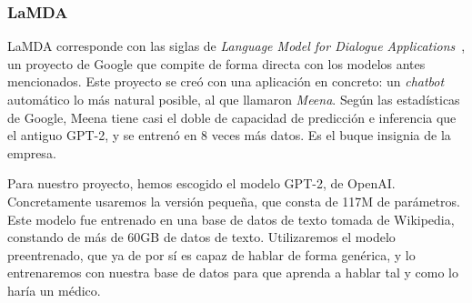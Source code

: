 \subsubsection{LaMDA}
LaMDA corresponde con las siglas de \textit{Language Model for Dialogue Applications}~\cite{LaMDAGoogle2020}, un proyecto de Google que compite de forma directa con los modelos antes mencionados. Este proyecto se creó con una aplicación en concreto: un \textit{chatbot} automático lo más natural posible, al que llamaron \textit{Meena}. Según las estadísticas de Google, Meena tiene casi el doble de capacidad de predicción e inferencia que el antiguo GPT-2, y se entrenó en 8 veces más datos. Es el buque insignia de la empresa.

\vspace{15mm}
Para nuestro proyecto, hemos escogido el modelo GPT-2, de OpenAI. Concretamente usaremos la versión pequeña, que consta de 117M de parámetros. Este modelo fue entrenado en una base de datos de texto tomada de Wikipedia, constando de más de 60GB de datos de texto. Utilizaremos el modelo preentrenado, que ya de por sí es capaz de hablar de forma genérica, y lo entrenaremos con nuestra base de datos para que aprenda a hablar tal y como lo haría un médico.



